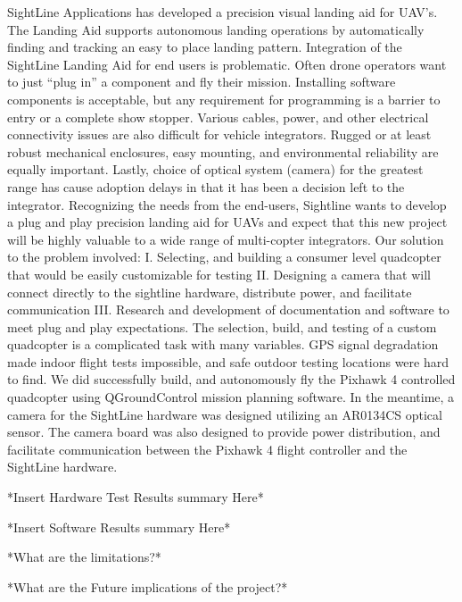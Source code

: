 \documentclass[11pt]{article}
\begin{document}
SightLine Applications has developed a precision visual landing aid for UAV's. The Landing Aid supports autonomous landing operations by automatically finding and tracking an easy to place landing pattern. Integration of the SightLine Landing Aid for end users is problematic.  Often drone operators want to just “plug in” a component and fly their mission.  Installing software components is acceptable, but any requirement for programming is a barrier to entry or a complete show stopper.  Various cables, power, and other electrical connectivity issues are also difficult for vehicle integrators.  Rugged or at least robust mechanical enclosures, easy mounting, and environmental reliability are equally important.  Lastly, choice of optical system (camera) for the greatest range has cause adoption delays in that it has been a decision left to the integrator. Recognizing the needs from the end-users, Sightline wants to develop a plug and play precision landing aid for UAVs and expect that this new project will be highly valuable to a wide range of multi-copter integrators. Our solution to the problem involved: I. Selecting, and building a consumer level quadcopter that would  be easily customizable for testing II. Designing a camera that will connect directly to the sightline hardware, distribute power, and facilitate communication III. Research and development of documentation and software to meet plug and play expectations. The selection, build, and testing of a custom quadcopter is a complicated task with many variables. GPS signal degradation made indoor flight tests impossible, and safe outdoor testing locations were hard to find. We did successfully build, and autonomously fly the Pixhawk 4 controlled quadcopter using QGroundControl mission planning software. In the meantime, a camera for the SightLine hardware was designed utilizing an AR0134CS optical sensor. The camera board was also designed to provide power distribution, and facilitate communication between the Pixhawk 4 flight controller and the SightLine hardware.

*Insert Hardware Test Results summary Here*

*Insert Software Results summary Here*

*What are the limitations?*

*What are the Future implications of the project?*

\pagebreak

\tableofcontents

\pagebreak

\listoffigures
\end{document}
